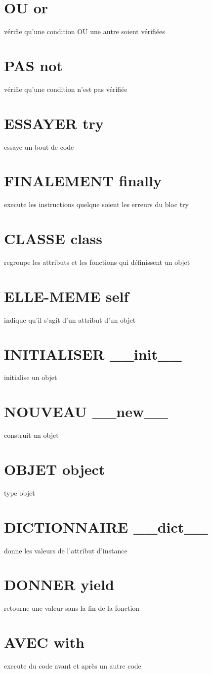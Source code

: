 \documentclass{book}
\begin{document}
\section{OU or }
  vérifie qu'une condition OU une autre soient vérifiées
\section{PAS not }
  vérifie qu'une condition n'est pas vérifiée
\section{ESSAYER try }
  essaye un bout de code
\section{FINALEMENT finally }
  execute les instructions quelque soient les erreurs du bloc try
\section{CLASSE class }
  regroupe les attributs et les fonctions qui définissent un objet
\section{ELLE-MEME self }
  indique qu'il s'agit d'un attribut d'un objet
\section{INITIALISER \_\_init\_\_ }
  initialise un objet
\section{NOUVEAU \_\_new\_\_ }
  construit un objet
\section{OBJET object }
  type objet
\section{DICTIONNAIRE \_\_dict\_\_ }
  donne les valeurs de l'attribut d'instance
\section{DONNER yield }
  retourne une valeur sans la fin de la fonction
\section{AVEC with }
  execute du code avant et après un autre code
\end{document}
